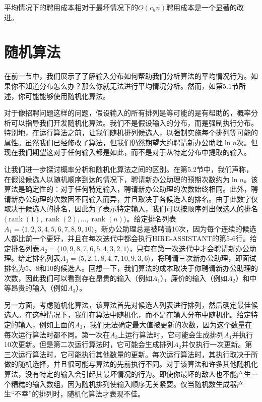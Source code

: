 \documentclass[lang=cn,newtx,10pt,scheme=chinese]{elegantbook}
\begin{document}
平均情况下的聘用成本相对于最坏情况下的$O\left(c_h n\right)$聘用成本是一个显著的改进。

\section{随机算法}

在前一节中，我们展示了了解输入分布如何帮助我们分析算法的平均情况行为。如果你不知道分布怎么办？那么你就无法进行平均情况分析。然而，如第5.1节所述，你可能能够使用随机化算法。

对于像招聘问题这样的问题，假设输入的所有排列是等可能的是有帮助的，概率分析可以指导我们开发随机化算法。我们不是假设输入的分布，而是强制执行分布。特别地，在运行算法之前，让我们随机排列候选人，以强制实施每个排列等可能的属性。虽然我们已经修改了算法，但我们仍然期望大约聘请新办公助理$\ln n$次。但现在我们期望这对于任何输入都是如此，而不是对于从特定分布中提取的输入。

让我们进一步探讨概率分析和随机化算法之间的区别。在第5.2节中，我们声称，在假设候选人以随机顺序到达的情况下，聘请新办公助理的预期次数约为$\ln n$。该算法是确定性的：对于任何特定输入，聘请新办公助理的次数始终相同。此外，聘请新办公助理的次数因不同输入而异，并且取决于各候选人的排名。由于此数字仅取决于候选人的排名，因此为了表示特定输入，我们可以按顺序列出候选人的排名$\langle\operatorname{rank}(1),\operatorname{rank}(2),\ldots,\operatorname{rank}(n)\rangle$。给定排名列表$A_1=\langle 1,2,3,4,5,6,7,8,9,10\rangle$，新办公助理总是被聘请10次，因为每个连续的候选人都比前一个更好，并且在每次迭代中都会执行HIRE-ASSISTANT的第5-6行。给定排名列表$A_2=\langle 10,9,8,7,6,5,4,3,2,1\rangle$，只有在第一次迭代中才会聘请新办公助理。给定排名列表$A_3=\langle 5,2,1,8,4,7,10,9,3,6\rangle$，将聘请三次新办公助理，即面试排名为5、8和10的候选人。回想一下，我们算法的成本取决于你聘请新办公助理的次数，因此我们可以看到存在昂贵的输入（例如$A_1$），廉价的输入（例如$A_2$）和中等昂贵的输入（例如$A_3$）。

另一方面，考虑随机化算法，该算法首先对候选人列表进行排列，然后确定最佳候选人。在这种情况下，我们在算法中随机化，而不是在输入分布中随机化。给定特定的输入，例如上面的$A_3$，我们无法确定最大值被更新的次数，因为这个数量在每次运行算法时都不同。第一次在$A_3$上运行算法时，它可能会生成排列$A_1$并执行10次更新。但是第二次运行算法时，它可能会生成排列$A_2$并仅执行一次更新。第三次运行算法时，它可能执行其他数量的更新。每次运行算法时，其执行取决于所做的随机选择，并且很可能与算法的先前执行不同。对于该算法和许多其他随机化算法，没有特定的输入会引起其最坏情况的行为。即使你最坏的敌人也不能产生一个糟糕的输入数组，因为随机排列使输入顺序无关紧要。仅当随机数生成器产生“不幸”的排列时，随机化算法才表现不佳。
\end{document}

